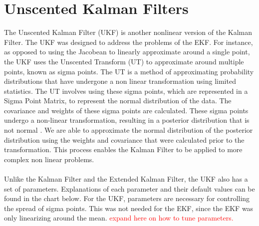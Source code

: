 \chapter{Unscented Kalman Filters}
\label{Unscented Kalman Filters}

The Unscented Kalman Filter (UKF) is another nonlinear version of the Kalman Filter. The UKF was designed to address the problems of the EKF. For instance, as opposed to using the Jacobean to linearly approximate around a single point, the UKF uses the Unscented Transform (UT) to approximate around multiple points, known as sigma points. The UT is a method of approximating probability distributions that have undergone a non linear transformation using limited statistics. The UT involves using these sigma points, which are represented in a Sigma Point Matrix, to represent the normal distribution of the data. The covariance and weights of these sigma points are calculated. These sigma points undergo a non-linear transformation, resulting in a posterior distribution that is not normal \cite{inbook, Wan01theunscented} . We are able to approximate the normal distribution of the posterior distribution using the weights and covariance that were calculated prior to the transformation. This process enables the Kalman Filter to be applied to more complex non linear problems. \\ \\
Unlike the Kalman Filter and the Extended Kalman Filter, the UKF also has a set of parameters. Explanations of each parameter and their default values can be found in the chart below. For the UKF, parameters are necessary for controlling the spread of sigma points. This was not needed for the EKF, since the EKF was only linearizing around the mean.
\textcolor{red}{expand here on how to tune parameters.}

